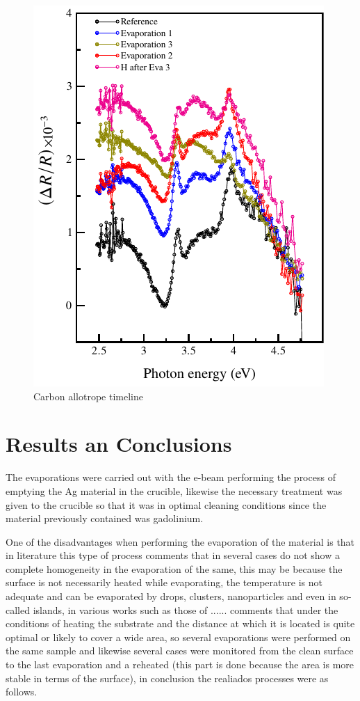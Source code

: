 \begin{figure}
	\centering
	\includegraphics[width=0.65\linewidth]{FIGURES/Anexo-CdTe/rds-evaporated-cdte-5.pdf}
	\caption{Carbon allotrope timeline}
	\label{fig:introfig32}
\end{figure}

\section{Results an Conclusions}
\vspace{-1cm}

The evaporations were carried out with the e-beam performing the process of emptying the Ag material in the crucible, likewise the necessary treatment was given to the crucible so that it was in optimal cleaning conditions since the material previously contained was gadolinium. 

One of the disadvantages when performing the evaporation of the material is that in literature this type of process comments that in several cases do not show a complete homogeneity in the evaporation of the same, this may be because the surface is not necessarily heated while evaporating, the temperature is not adequate and can be evaporated by drops, clusters, nanoparticles and even in so-called islands, in various works such as those of ...... comments that under the conditions of heating the substrate and the distance at which it is located is quite optimal or likely to cover a wide area, so several evaporations were performed on the same sample and likewise several cases were monitored from the clean surface to the last evaporation and a reheated (this part is done because the area is more stable in terms of the surface), in conclusion the realiados processes were as follows.  